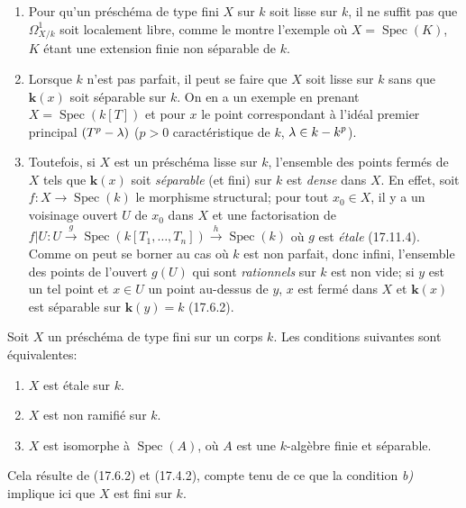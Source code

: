 \begin{remarks}[17.15.10]
\label{IV.17.15.10}
\begin{enumerate}
  \item[(i)] Pour qu'un préschéma de type fini $X$ sur $k$ soit lisse sur $k$, il ne suffit pas que $\varOmega^1_{X/k}$ soit localement libre, comme le montre l'exemple où $X=\operatorname{Spec}(K)$, $K$ étant une extension finie non séparable de $k$.
  \item[(ii)] Lorsque $k$ n'est pas parfait, il peut se faire que $X$ soit lisse sur $k$ sans que $\boldsymbol{k}(x)$ soit séparable sur $k$. On en a un exemple en prenant $X=\operatorname{Spec}(k[T])$ et pour $x$ le point correspondant à l'idéal premier principal $(T^p-\lambda)$ ($p>0$ caractéristique de $k$, $\lambda\in k- k^p$).
  \item[(iii)] Toutefois, si $X$ est un préschéma lisse sur $k$, l'ensemble des points fermés de $X$ tels que $\boldsymbol{k}(x)$ soit \emph{séparable} (et fini) sur $k$ est \emph{dense} dans $X$. En effet, soit $f:X\to\operatorname{Spec}(k)$ le morphisme structural; pour tout $x_0\in X$, il y a un voisinage ouvert $U$ de $x_0$ dans $X$ et une factorisation de $f|U:U\xrightarrow{g}\operatorname{Spec}(k[T_1,\ldots,T_n])\xrightarrow{h}\operatorname{Spec}(k)$ où $g$ est \emph{étale} (17.11.4). Comme on peut se borner au cas où $k$ est non parfait, donc infini, l'ensemble des points de l'ouvert $g(U)$ qui sont \emph{rationnels} sur $k$ est non vide; si $y$ est un tel point et $x\in U$ un point au-dessus de $y$, $x$ est fermé dans $X$ et $\boldsymbol{k}(x)$ est séparable sur $\boldsymbol{k}(y)=k$ (17.6.2).
\end{enumerate}
\end{remarks}

\begin{proposition}[17.15.11]
\label{IV.17.15.11}
Soit $X$ un préschéma de type fini sur un corps $k$. Les conditions suivantes sont équivalentes:
\begin{enumerate}
  \item[\textup{a)}] $X$ est étale sur $k$.
  \item[\textup{b)}] $X$ est non ramifié sur $k$.
  \item[\textup{c)}] $X$ est isomorphe à $\operatorname{Spec}(A)$, où $A$ est une $k$-algèbre finie et séparable.
\end{enumerate}
\end{proposition}

Cela résulte de (17.6.2) et (17.4.2), compte tenu de ce que la condition \emph{b)} implique ici que $X$ est fini sur $k$.

